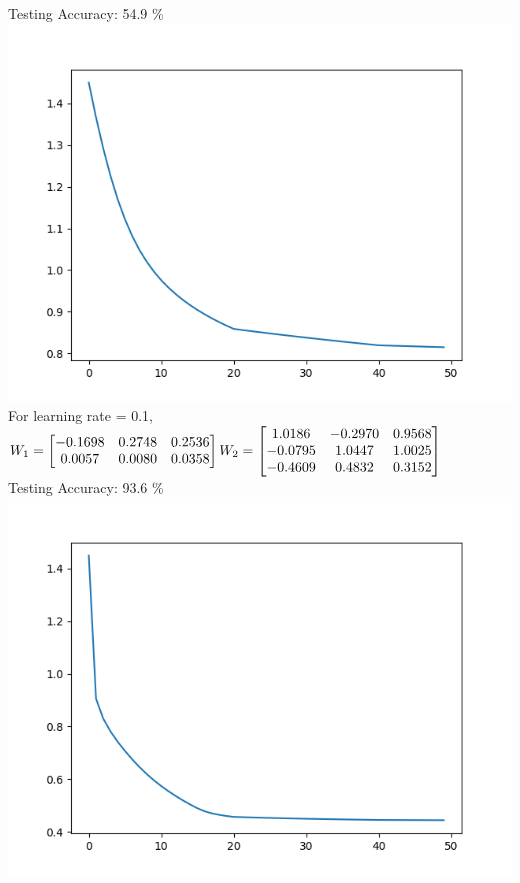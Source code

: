 \documentclass[12pt]{article}
\begin{document}
Testing Accuracy: 54.9 \%\\
\includegraphics[scale=0.5]{train_loss_q4b1}\newpage
For learning rate = 0.1,\\
$W_{1} = \begin{bmatrix}-0.1698 & 0.2748 & 0.2536\\
0.0057 & 0.0080 & 0.0358\\\end{bmatrix}\\ W_{2} =
\begin{bmatrix}
1.0186 & -0.2970 & 0.9568\\
-0.0795 & 1.0447 & 1.0025\\
-0.4609 & 0.4832 & 0.3152\\\end{bmatrix}$ \\      
Testing Accuracy: 93.6 \%\\
\includegraphics[scale=0.5]{train_loss_q4a}\\
\end{document}
